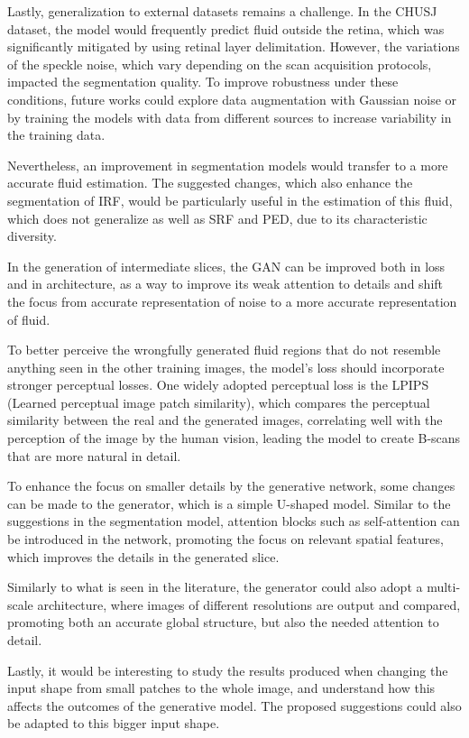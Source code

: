 \par
Lastly, generalization to external datasets remains a challenge. In the CHUSJ dataset, the model would frequently predict fluid outside the retina, which was significantly mitigated by using retinal layer delimitation. However, the variations of the speckle noise, which vary depending on the scan acquisition protocols, impacted the segmentation quality. To improve robustness under these conditions, future works could explore data augmentation with Gaussian noise or by training the models with data from different sources to increase variability in the training data.
\par
Nevertheless, an improvement in segmentation models would transfer to a more accurate fluid estimation. The suggested changes, which also enhance the segmentation of IRF, would be particularly useful in the estimation of this fluid, which does not generalize as well as SRF and PED, due to its characteristic diversity.
\par
In the generation of intermediate slices, the GAN can be improved both in loss and in architecture, as a way to improve its weak attention to details and shift the focus from accurate representation of noise to a more accurate representation of fluid.
\par
To better perceive the wrongfully generated fluid regions that do not resemble anything seen in the other training images, the model's loss should incorporate stronger perceptual losses. One widely adopted perceptual loss is the LPIPS (Learned perceptual image patch similarity), which compares the perceptual similarity between the real and the generated images, correlating well with the perception of the image by the human vision, leading the model to create B-scans that are more natural in detail. 
\par
To enhance the focus on smaller details by the generative network, some changes can be made to the generator, which is a simple U-shaped model. Similar to the suggestions in the segmentation model, attention blocks such as self-attention can be introduced in the network, promoting the focus on relevant spatial features, which improves the details in the generated slice.
\par
Similarly to what is seen in the literature, the generator could also adopt a multi-scale architecture, where images of different resolutions are output and compared, promoting both an accurate global structure, but also the needed attention to detail.
\par
Lastly, it would be interesting to study the results produced when changing the input shape from small patches to the whole image, and understand how this affects the outcomes of the generative model. The proposed suggestions could also be adapted to this bigger input shape.
